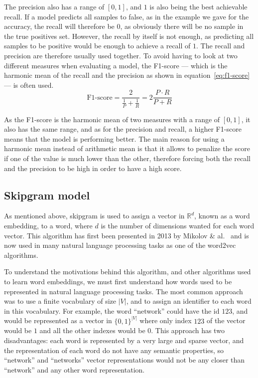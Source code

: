 The precision also has a range of $[0, 1]$, and $1$ is also being the best
achievable recall. If a model predicts all samples to false, as in the example
we gave for the accuracy, the recall will therefore be $0$, as obviously there
will be no sample in the true positives set. However, the recall by itself is
not enough, as predicting all samples to be positive would be enough to achieve
a recall of $1$. The recall and precision are therefore usually used together.
To avoid having to look at two different measures when evaluating a model, the
F1-score --- which is the harmonic mean of the recall and the precision as shown
in equation~\ref{eq:f1-score} --- is often used.
\begin{equation}
  \label{eq:f1-score}
  \text{F1-score} = \dfrac{2}{\frac{1}{P} + \frac{1}{R}} = 2\frac{P\cdot R}{P + R}
\end{equation}

As the F1-score is the harmonic mean of two measures with a range of $[0, 1]$,
it also has the same range, and as for the precision and recall, a higher
F1-score means that the model is performing better.
The main reason for using a harmonic mean instead of arithmetic mean is that it
allows to penalize the score if one of the value is much lower than the other,
therefore forcing both the recall and the precision to be high in order to have
a high score.
\subsection{Skipgram model}
As mentioned above, skipgram is used to assign a vector in $\mathbb{R}^d$, known
as a word embedding, to a word, where $d$ is the number of dimensions wanted for
each word vector. This algorithm has first been presented in 2013 by Mikolov \&
al.~\cite{DBLP:journals/corr/MikolovSCCD13} and is now used in many natural
language processing tasks as one of the word2vec algorithms.

To understand the motivations behind this algorithm, and other algorithms used
to learn word embeddings, we must first understand how words used to be
represented in natural language processing tasks. The most common approach was
to use a finite vocabulary of size $|V|$, and to assign an identifier to each
word in this vocabulary. For example, the word ``network'' could have the id
$123$, and would be represented as a vector in ${\{0,1\}}^{|V|}$ where only index
$123$ of the vector would be $1$ and all the other indexes would be $0$. This
approach has two disadvantages: each word is represented by a very large and
sparse vector, and the representation of each word do not have any semantic
properties, so ``network'' and ``networks'' vector representations would not be
any closer than ``network'' and any other word representation.

